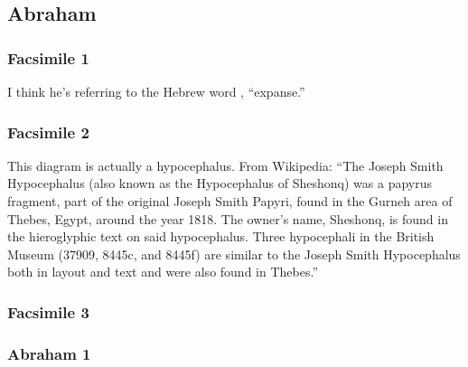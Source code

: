 \subsection{Abraham} %

	\subsubsection{Facsimile 1} %
	
		\begin{compactdesc}
		
		\item[12$\vert$]
		\begin{compactdesc}
		\item[Raukeeyang] I think he's referring to the Hebrew word , ``expanse.''
		\end{compactdesc}
		
		\end{compactdesc}
	
	\subsubsection{Facsimile 2} %
	
		This diagram is actually a hypocephalus. From Wikipedia: ``The Joseph Smith Hypocephalus (also known as the Hypocephalus of Sheshonq) was a papyrus fragment, part of the original Joseph Smith Papyri, found in the Gurneh area of Thebes, Egypt, around the year 1818. The owner's name, Sheshonq, is found in the hieroglyphic text on said hypocephalus. Three hypocephali in the British Museum (37909, 8445c, and 8445f) are similar to the Joseph Smith Hypocephalus both in layout and text and were also found in Thebes.''
	
	\subsubsection{Facsimile 3} %

	\subsubsection{Abraham 1} %
	
